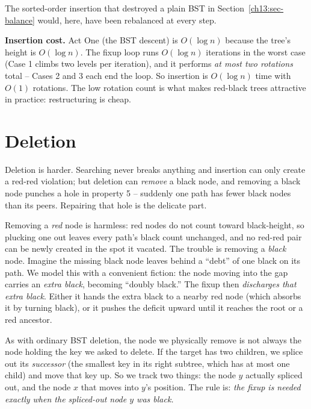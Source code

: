 The sorted-order insertion that destroyed a plain BST in
Section~\ref{ch13:sec-balance} would, here, have been rebalanced at every step.

\begin{complexitybox}
\textbf{Insertion cost.} Act One (the BST descent) is $O(\log n)$ because the
tree's height is $O(\log n)$. The fixup loop runs $O(\log n)$ iterations in the
worst case (Case 1 climbs two levels per iteration), and it performs
\emph{at most two rotations} total -- Cases 2 and 3 each end the loop. So insertion
is $O(\log n)$ time with $O(1)$ rotations. The low rotation count is what makes
red-black trees attractive in practice: restructuring is cheap.
\end{complexitybox}

\section{Deletion}

Deletion is harder. Searching never breaks anything and insertion can only
create a red-red violation; but deletion can \emph{remove} a black node,
and removing a black node punches a hole in property 5 -- suddenly one path has
fewer black nodes than its peers. Repairing that hole is the delicate part.

\begin{intuitionbox}
Removing a \emph{red} node is harmless: red nodes do not count toward
black-height, so plucking one out leaves every path's black count unchanged, and
no red-red pair can be newly created in the spot it vacated. The trouble is
removing a \emph{black} node. Imagine the missing black node leaves behind a
``debt'' of one black on its path. We model this with a convenient fiction: the
node moving into the gap carries an \emph{extra black}, becoming ``doubly
black.'' The fixup then \emph{discharges that extra black}. Either it hands the
extra black to a nearby red node (which absorbs it by turning black), or it
pushes the deficit upward until it reaches the root or a red ancestor.
\end{intuitionbox}

As with ordinary BST deletion, the node we physically remove is not always the
node holding the key we asked to delete. If the target has two children, we splice
out its \emph{successor} (the smallest key in its right subtree, which has at most
one child) and move that key up. So we track two things: the node $y$ actually
spliced out, and the node $x$ that moves into $y$'s position. The rule is:
\emph{the fixup is needed exactly when the spliced-out node $y$ was black.}

